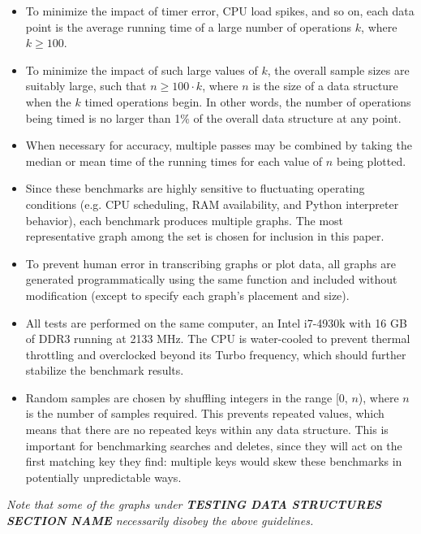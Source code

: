 \documentclass{article}
\newcommand {\todo}[1] {{\textbf{\color{red}#1}}}
\begin{document}
\begin{itemize}
    \item To minimize the impact of timer error, CPU load spikes, and so on, each data point is the average running time of a large number of operations $k$, where $k \geq 100$.
    \item To minimize the impact of such large values of $k$, the overall sample sizes are suitably large, such that $n \geq 100 \cdot k$, where $n$ is the size of a data structure when the $k$ timed operations begin. In other words, the number of operations being timed is no larger than 1\% of the overall data structure at any point.
    \item When necessary for accuracy, multiple passes may be combined by taking the median or mean time of the running times for each value of $n$ being plotted.
    \item Since these benchmarks are highly sensitive to fluctuating operating conditions (e.g. CPU scheduling, RAM availability, and Python interpreter behavior), each benchmark produces multiple graphs. The most representative graph among the set is chosen for inclusion in this paper.
    \item To prevent human error in transcribing graphs or plot data, all graphs are generated programmatically using the same function and included without modification (except to specify each graph's placement and size).
    \item All tests are performed on the same computer, an Intel i7-4930k with 16 GB of DDR3 running at 2133 MHz. The CPU is water-cooled to prevent thermal throttling and overclocked beyond its Turbo frequency, which should further stabilize the benchmark results.
    \item Random samples are chosen by shuffling integers in the range [0, $n$), where $n$ is the number of samples required. This prevents repeated values, which means that there are no repeated keys within any data structure. This is important for benchmarking searches and deletes, since they will act on the first matching key they find: multiple keys would skew these benchmarks in potentially unpredictable ways.
\end{itemize}

\emph{Note that some of the graphs under \todo{TESTING DATA STRUCTURES SECTION NAME} necessarily disobey the above guidelines.}
\end{document}
